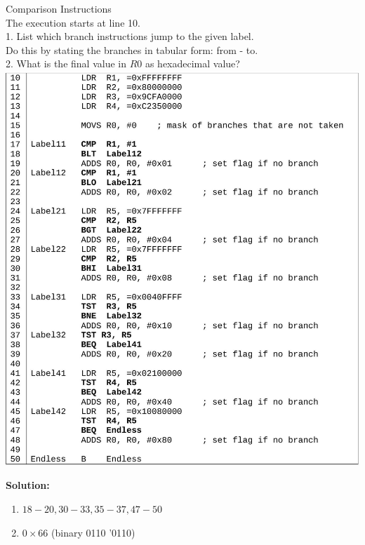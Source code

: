 \begin{example2}{Comparison Instructions}\\
The execution starts at line 10.
\vspace{2mm}\\
1. List which branch instructions jump to the given label.\\

Do this by stating the branches in tabular form: from - to.
\vspace{2mm}\\
2. What is the final value in $R 0$ as hexadecimal value?
\vspace{2mm}\\
\includegraphics[width=\linewidth]{images/2025_01_02_9902c2d2685de638ef73g-4}

\textbf{Solution:}
\begin{enumerate}
  \item $18-20,30-33,35-37,47-50$
  \item $0 \times 66$ (binary 0110 '0110)
\end{enumerate}
\end{example2}














